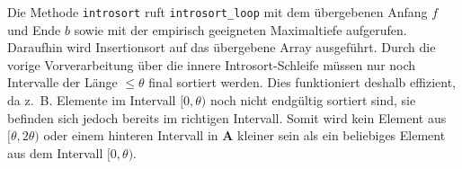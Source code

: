 Die Methode \texttt{introsort} ruft \texttt{introsort\_loop} mit dem übergebenen Anfang $f$ und Ende $b$ sowie mit der empirisch geeigneten Maximaltiefe aufgerufen. Daraufhin wird Insertionsort auf das übergebene Array ausgeführt. Durch die vorige Vorverarbeitung über die innere Introsort-Schleife müssen nur noch Intervalle der Länge $\leq \theta$ final sortiert werden. Dies funktioniert deshalb effizient, da z.~B. Elemente im Intervall $[0, \theta)$ noch nicht endgültig sortiert sind, sie befinden sich jedoch bereits im richtigen Intervall. Somit wird kein Element aus $[\theta, 2 \theta)$ oder einem hinteren Intervall in \textbf{A} kleiner sein als ein beliebiges Element aus dem Intervall $[0,\theta)$.
